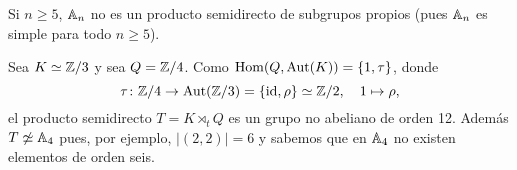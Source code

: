 \begin{example}
Si $n\geq5$, $\mathbb{A}_n$ no es un producto semidirecto de subgrupos propios (pues $\mathbb{A}_n$ es simple para todo $n\geq5$). 	
\end{example}

\begin{example}
Sea $K\simeq\mathbb{Z}/3$ y sea $Q=\mathbb{Z}/4$. Como $\operatorname{Hom}(Q,\operatorname{Aut}(K))=\{1,\tau\}$, donde 
\[
\tau\colon\mathbb{Z}/4\to\operatorname{Aut}(\mathbb{Z}/3)=\{\operatorname{id},\rho\}\simeq\mathbb{Z}/2,\quad 1\mapsto\rho,
\]
el producto semidirecto $T=K\rtimes_t Q$ es un grupo no abeliano de orden 12. Además $T\not\simeq\mathbb{A}_4$ pues, por ejemplo, $|(2,2)|=6$ y sabemos que en $\mathbb{A}_4$ no existen elementos de orden seis. 
\end{example}



